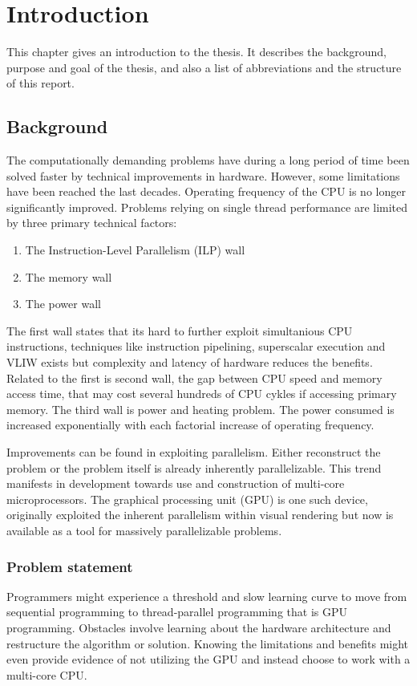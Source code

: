 \chapter{Introduction}\label{cha:intro}
This chapter gives an introduction to the thesis. It describes the background, purpose and goal of the thesis, and also a list of abbreviations and the structure of this report.

\section{Background}
The computationally demanding problems have during a long period of time been solved faster by technical improvements in hardware. However, some limitations have been reached the last decades. Operating frequency of the CPU is no longer significantly improved. Problems relying on single thread performance are limited by three primary technical factors:
\begin{enumerate}
	\item The Instruction-Level Parallelism (ILP) wall
	\item The memory wall
	\item The power wall
\end{enumerate}

The first wall states that its hard to further exploit simultanious CPU instructions, techniques like instruction pipelining, superscalar execution and VLIW exists but complexity and latency of hardware reduces the benefits. Related to the first is second wall, the gap between CPU speed and memory access time, that may cost several hundreds of CPU cykles if accessing primary memory. The third wall is power and heating problem. The power consumed is increased exponentially with each factorial increase of operating frequency.

Improvements can be found in exploiting parallelism. Either reconstruct the problem or the problem itself is already inherently parallelizable. This trend manifests in development towards use and construction of multi-core microprocessors. The graphical processing unit (GPU) is one such device, originally exploited the inherent parallelism within visual rendering but now is available as a tool for massively parallelizable problems.

\subsection{Problem statement}
Programmers might experience a threshold and slow learning curve to move from sequential programming to thread-parallel programming that is GPU programming. Obstacles involve learning about the hardware architecture and restructure the algorithm or solution. Knowing the limitations and benefits might even provide evidence of not utilizing the GPU and instead choose to work with a multi-core CPU.

